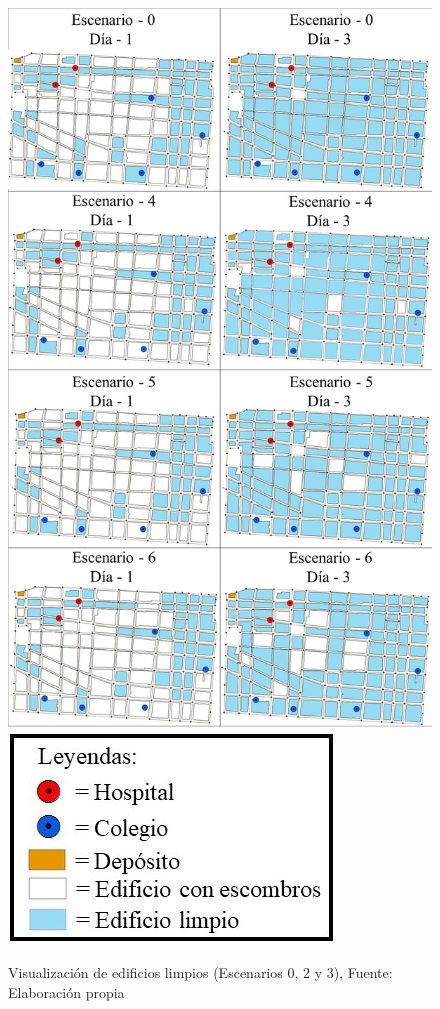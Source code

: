 \documentclass[letterpaper,conference]{IEEEtran}
\begin{document}
\begin{figure}[h!]
\centering
\includegraphics[scale=0.25]{Figuras/visu4.jpg}
\includegraphics[scale=0.45]{Figuras/simb2.jpg}  
\caption{Visualización de edificios limpios  (Escenarios 0, 2 y 3), Fuente: Elaboración propia}
\label{fig:esc0456-visu}
\end{figure}
\end{document}
